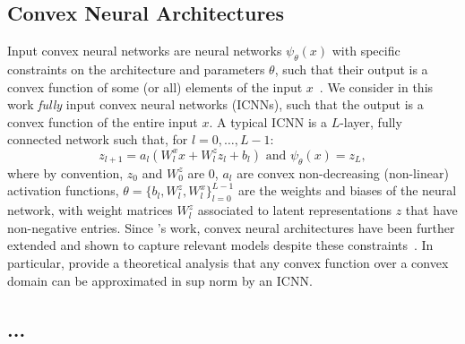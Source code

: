 \subsection{Convex Neural Architectures}
Input convex neural networks are neural networks $\psi_\theta(x)$ with specific constraints on the architecture and parameters $\theta$, such that their output is a convex function of some (or all) elements of the input $x$~\citep{amos2017input}. We consider in this work \textit{fully} input convex neural networks (ICNNs), such that the output is a convex function of the entire input $x$. A typical ICNN is a $L$-layer, fully connected network such that, for $l = 0, \dots, L-1$:
\begin{equation} \label{eq:icnn}
    z_{l+1} = a_l(W^x_lx + W^z_l z_l + b_l)  \text{ and } \psi_\theta(x) = z_L,
\end{equation}
where by convention, $z_0$ and $W^z_0$ are $0$, $a_l$ are convex non-decreasing (non-linear) activation functions, $\theta=\{b_l, W^z_l, W^x_l\}_{l=0}^{L-1}$ are the weights and biases of the neural network, with weight matrices $W^z_l$ associated to latent representations $z$ that have non-negative entries. Since \citet{amos2017input}'s work, convex neural architectures have been further extended and shown to capture relevant models despite these constraints~\citep{amos2017input, makkuva2020optimal, huang2021convex}. In particular, \citet{chen2018optimal} provide a theoretical analysis that any convex function over a convex domain can be approximated in sup norm by an ICNN.

\subsection{...}

